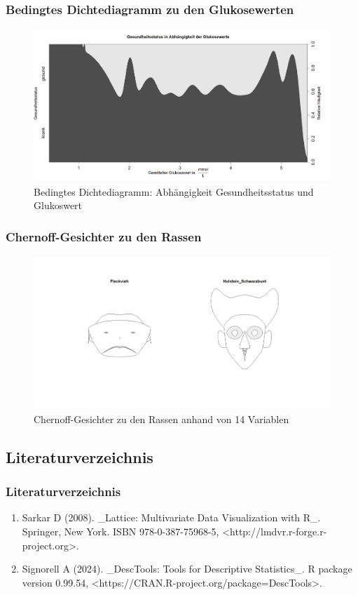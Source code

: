 \documentclass{beamer}
\begin{document}
	\begin{frame}
		\frametitle{Bedingtes Dichtediagramm zu den Glukosewerten}
		\begin{figure}[h]
			\centering
			\includegraphics[scale=0.33]{Bedingtes Dichtediagramm.png}
			\vspace{-0.6cm}
			\caption{Bedingtes Dichtediagramm: Abhängigkeit Gesundheitsstatus  und Glukoswert}
		\end{figure}
	\end{frame}
	\begin{frame}
		\frametitle{Chernoff-Gesichter zu den Rassen}
	\begin{figure}[h]
		\centering
		\includegraphics[width=1\textwidth]{Chernoff-Gesichter.png}
		\vspace{-0.6cm}
		\caption{Chernoff-Gesichter zu den Rassen anhand von 14 Variablen}
	\end{figure}
	\end{frame}
\begin{frame}
	\section{Literaturverzeichnis}
	\frametitle{Literaturverzeichnis}
	\begin{enumerate}[]
		\item Sarkar D (2008). \_Lattice: Multivariate Data Visualization with R\_.
		Springer, New York. ISBN 978-0-387-75968-5,
		<http://lmdvr.r-forge.r-project.org>.
		\item Signorell A (2024). \_DescTools: Tools for Descriptive Statistics\_. R package
		version 0.99.54, <https://CRAN.R-project.org/package=DescTools>.
	\end{enumerate}
	
\end{frame}
\end{document}
